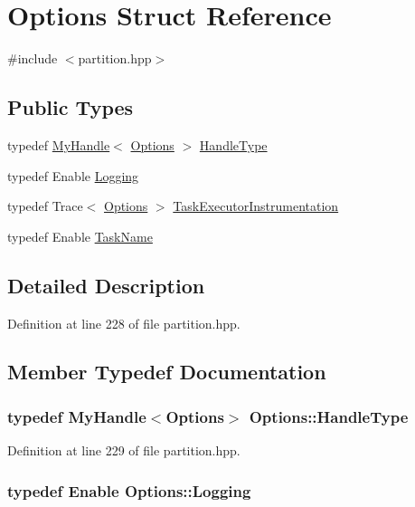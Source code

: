\hypertarget{struct_options}{
\section{Options Struct Reference}
\label{struct_options}
}


{\ttfamily \#include $<$partition.hpp$>$}\subsection*{Public Types}
\begin{DoxyCompactItemize}
\item 
typedef \hyperlink{struct_my_handle}{MyHandle}$<$ \hyperlink{struct_options}{Options} $>$ \hyperlink{struct_options_a5905493ef132e2f8f4b9660e14d2fd55}{HandleType}
\item 
typedef Enable \hyperlink{struct_options_ad218e0ed60d64923f3cd09a0d7536a3d}{Logging}
\item 
typedef Trace$<$ \hyperlink{struct_options}{Options} $>$ \hyperlink{struct_options_a335bba1a97e116e203888f0581f17bc6}{TaskExecutorInstrumentation}
\item 
typedef Enable \hyperlink{struct_options_a6a43239596fc6edced534372fec5a7fa}{TaskName}
\end{DoxyCompactItemize}


\subsection{Detailed Description}


Definition at line 228 of file partition.hpp.

\subsection{Member Typedef Documentation}
\hypertarget{struct_options_a5905493ef132e2f8f4b9660e14d2fd55}{
\subsubsection[{HandleType}]{\setlength{\rightskip}{0pt plus 5cm}typedef {\bf MyHandle}$<${\bf Options}$>$ {\bf Options::HandleType}}}
\label{struct_options_a5905493ef132e2f8f4b9660e14d2fd55}


Definition at line 229 of file partition.hpp.\hypertarget{struct_options_ad218e0ed60d64923f3cd09a0d7536a3d}{
\subsubsection[{Logging}]{\setlength{\rightskip}{0pt plus 5cm}typedef Enable {\bf Options::Logging}}}
\label{struct_options_ad218e0ed60d64923f3cd09a0d7536a3d}


